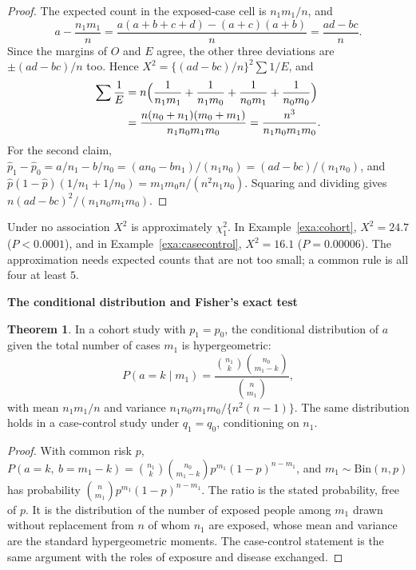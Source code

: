 \documentclass[11pt,a4paper]{article}
\numberwithin{equation}{section}
\theoremstyle{definition}
\newtheorem{thm}{Theorem}[subsection]
\newcommand{\subhead}[1]{%
  \par\medskip\noindent\textbf{#1}\par\nobreak\smallskip}
\begin{document}
\begin{proof}
The expected count in the exposed-case cell is $n_1 m_1/n$, and
\[
a - \frac{n_1 m_1}{n} = \frac{a(a + b + c + d) - (a + c)(a + b)}{n} = \frac{ad - bc}{n} .
\]
Since the margins of $O$ and $E$ agree, the other three deviations are $\pm(ad - bc)/n$ too. Hence $X^2 = \{(ad - bc)/n\}^2 \sum 1/E$, and
\begin{align*}
\sum \frac{1}{E} &= n\Bigl(\frac{1}{n_1 m_1} + \frac{1}{n_1 m_0} + \frac{1}{n_0 m_1} + \frac{1}{n_0 m_0}\Bigr) \\
&= \frac{n(n_0 + n_1)(m_0 + m_1)}{n_1 n_0 m_1 m_0} = \frac{n^3}{n_1 n_0 m_1 m_0} .
\end{align*}
For the second claim, $\hat p_1 - \hat p_0 = a/n_1 - b/n_0 = (an_0 - bn_1)/(n_1 n_0) = (ad - bc)/(n_1 n_0)$, and
$\hat p(1 - \hat p)(1/n_1 + 1/n_0) = m_1 m_0 n/(n^2 n_1 n_0)$. Squaring and dividing gives $n(ad - bc)^2/(n_1 n_0 m_1 m_0)$.
\end{proof}

Under no association $X^2$ is approximately $\chi^2_1$. In Example~\ref{exa:cohort}, $X^2 = 24.7$ ($P < 0.0001$), and in
Example~\ref{exa:casecontrol}, $X^2 = 16.1$ ($P = 0.00006$). The approximation needs expected counts that are not too small; a common rule
is all four at least $5$.

\subhead{The conditional distribution and Fisher's exact test}

\begin{thm}
\label{thm:hyper}
In a cohort study with $p_1 = p_0$, the conditional distribution of $a$ given the total number of cases $m_1$ is hypergeometric:
\[
P(a = k \mid m_1) = \frac{\binom{n_1}{k}\binom{n_0}{m_1 - k}}{\binom{n}{m_1}} ,
\]
with mean $n_1 m_1/n$ and variance $n_1 n_0 m_1 m_0/\{n^2(n - 1)\}$. The same distribution holds in a case-control study under $q_1 = q_0$,
conditioning on $n_1$.
\end{thm}

\begin{proof}
With common risk $p$, $P(a = k,\ b = m_1 - k) = \binom{n_1}{k}\binom{n_0}{m_1 - k} p^{m_1}(1 - p)^{n - m_1}$, and $m_1 \sim \text{Bin}(n, p)$ has probability
$\binom{n}{m_1}p^{m_1}(1 - p)^{n - m_1}$. The ratio is the stated probability, free of $p$. It is the distribution of the number of exposed people among
$m_1$ drawn without replacement from $n$ of whom $n_1$ are exposed, whose mean and variance are the standard hypergeometric moments.
The case-control statement is the same argument with the roles of exposure and disease exchanged.
\end{proof}
\end{document}
